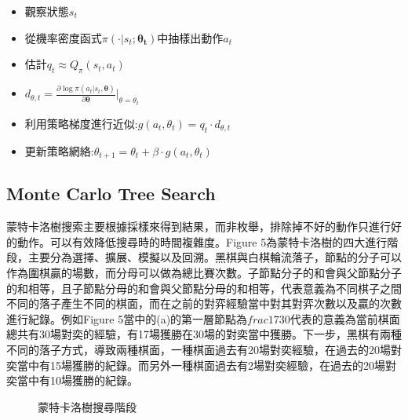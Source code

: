 \documentclass[a4paper,12pt]{article}
\begin{document}
\begin{itemize}
    \item 觀察狀態$s_{t}$
    \item 從機率密度函式$\pi(\cdot|s_{t};\mathbf{\theta_{t}})$中抽樣出動作$a_{t}$
    \item 估計$q_{t}\approx Q_{\pi}(s_{t},a_{t})$
    \item $d_{\theta,t}=\frac{\partial\log\pi(a_{t}|s_{t},\mathbf{\theta})}{\partial\mathbf{\theta}}{|}_{\theta=\theta_{t}}$
    \item 利用策略梯度進行近似:$g(a_{t},\theta_{t})=q_{t}\cdot d_{\theta,t}$
    \item 更新策略網絡:$\theta_{t+1}=\theta_{t}+\beta\cdot g(a_{t},\theta_{t})$
\end{itemize}

\subsection{Monte Carlo Tree Search}
\quad 蒙特卡洛樹搜索主要根據採樣來得到結果，而非枚舉，排除掉不好的動作只進行好的動作。可以有效降低搜尋時的時間複雜度。Figure 5為蒙特卡洛樹的四大進行階段，主要分為選擇、擴展、模擬以及回溯。黑棋與白棋輪流落子，節點的分子可以作為圍棋贏的場數，而分母可以做為總比賽次數。子節點分子的和會與父節點分子的和相等，且子節點分母的和會與父節點分母的和相等，代表意義為不同棋子之間不同的落子產生不同的棋面，而在之前的對弈經驗當中對其對弈次數以及贏的次數進行紀錄。例如Figure 5當中的(a)的第一層節點為$frac{17}{30}$代表的意義為當前棋面總共有30場對奕的經驗，有17場獲勝在30場的對奕當中獲勝。下一步，黑棋有兩種不同的落子方式，導致兩種棋面，一種棋面過去有20場對奕經驗，在過去的20場對奕當中有15場獲勝的紀錄。而另外一種棋面過去有2場對奕經驗，在過去的20場對奕當中有10場獲勝的紀錄。

\begin{figure}[h]
\centering

%
%
%
%
\centering
\caption{蒙特卡洛樹搜尋階段}
\end{figure}
\end{document}
